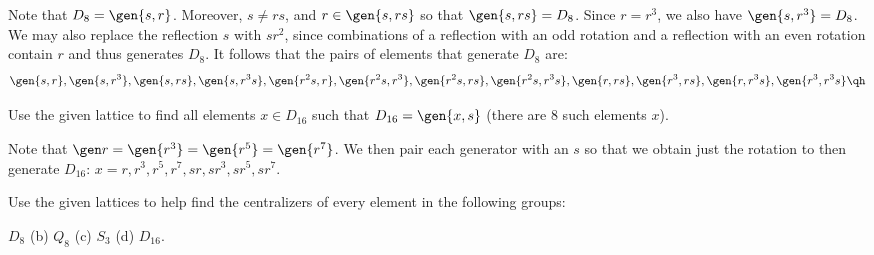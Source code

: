 \begin{sol}
    Note that $D_8 = \gen{s, r}$. Moreover, $s \neq rs$, and $r \in \gen{s, rs}$ so that $\gen{s, rs} = D_8$. Since $r = r^3$, we also have $\gen{s, r^3} = D_8$. We may also replace the reflection $s$ with $sr^2$, since combinations of a reflection with an odd rotation and a reflection with an even rotation contain $r$ and thus generates $D_8$. It follows that the pairs of elements that generate $D_8$ are:
    \[\gen{s, r}, \gen{s, r^3}, \gen{s, rs}, \gen{s, r^3s}, \gen{r^2s, r}, \gen{r^2s, r^3}, \gen{r^2s, rs}, \gen{r^2s, r^3s}, \gen{r, rs}, \gen{r^3, rs}, \gen{r, r^3s}, \gen{r^3, r^3s} \qh\]
\end{sol}

\begin{exercise}\label{ex2.5.5}
    Use the given lattice to find all elements $x \in D_{16}$ such that $D_{16} = \gen{x, s}$ (there are 8 such elements $x$).
\end{exercise}

\begin{sol}
    Note that $\gen r= \gen{r^3} = \gen{r^5} = \gen{r^7}$. We then pair each generator with an $s$ so that we obtain just the rotation to then generate $D_{16}$: $x = r, r^3, r^5, r^7, sr, sr^3, sr^5, sr^7$.
\end{sol}

\begin{exercise}\label{ex2.5.6}
    Use the given lattices to help find the centralizers of every element in the following groups:
    \begin{subproblems}
        \item $D_8$ \quad (b) $Q_8$ \quad (c) $S_3$ \quad (d) $D_{16}$.
    \end{subproblems}
\end{exercise}

